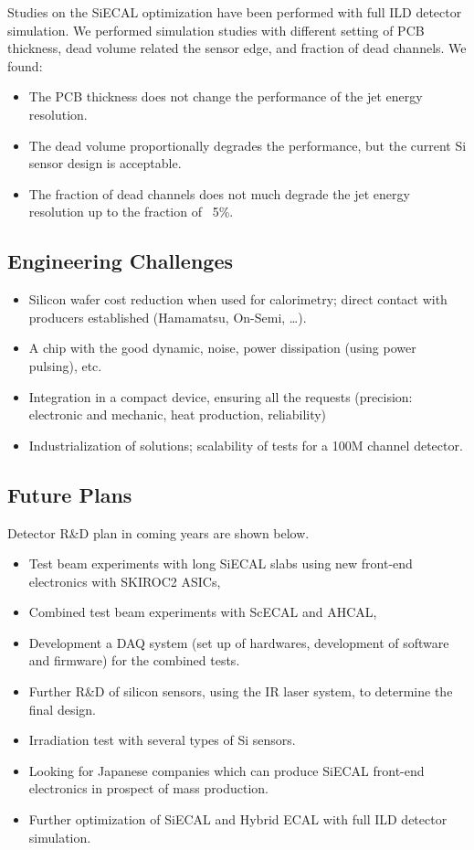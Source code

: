 Studies on the SiECAL optimization have been performed with full ILD detector simulation. We performed simulation studies with different setting of PCB thickness, dead volume related the sensor edge, and fraction of dead channels. We found:
\begin{itemize}
	\item The PCB thickness does not change the performance of the jet energy resolution.
	\item The dead volume proportionally degrades the performance, but the current Si sensor design is acceptable.
	\item The fraction of dead channels does not much degrade the jet energy resolution up to the fraction of ~5\%.
\end{itemize}

\subsection{Engineering Challenges}
\begin{itemize}
	\item Silicon wafer cost reduction when used for calorimetry; direct contact with producers established (Hamamatsu, On-Semi, \ldots).
	\item A chip with the good dynamic, noise, power dissipation (using power pulsing), etc.
	\item Integration in a compact device, ensuring all the requests (precision: electronic and mechanic, heat production, reliability)
	\item Industrialization of solutions; scalability of tests for a 100M channel detector.
\end{itemize}

\subsection{Future Plans}
Detector R\&D plan in coming years are shown below.
\begin{itemize}
\item Test beam experiments with long SiECAL slabs using new front-end electronics with SKIROC2 ASICs,
\item Combined test beam experiments with ScECAL and AHCAL,
\item Development a DAQ system (set up of hardwares, development of software
and firmware) for the combined tests.
\item Further R\&D of silicon sensors, using the IR laser system, to determine the final design.
\item Irradiation test with several types of Si sensors.
\item Looking for Japanese companies which can produce SiECAL front-end
electronics in prospect of mass production.
\item Further optimization of SiECAL and Hybrid ECAL with full ILD detector simulation.
\end{itemize}

